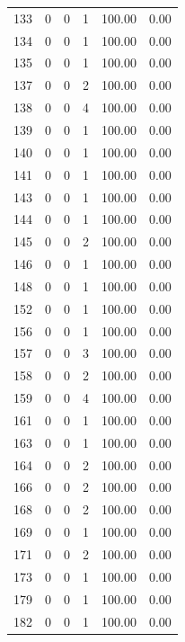 \documentclass[11pt]{article}
\begin{document}
\begin{longtable}{r|r|r|r|r|r}
    133   & 0     & 0     & 1     & 100.00 & 0.00 \\
    134   & 0     & 0     & 1     & 100.00 & 0.00 \\
    135   & 0     & 0     & 1     & 100.00 & 0.00 \\
    137   & 0     & 0     & 2     & 100.00 & 0.00 \\
    138   & 0     & 0     & 4     & 100.00 & 0.00 \\
    139   & 0     & 0     & 1     & 100.00 & 0.00 \\
    140   & 0     & 0     & 1     & 100.00 & 0.00 \\
    141   & 0     & 0     & 1     & 100.00 & 0.00 \\
    143   & 0     & 0     & 1     & 100.00 & 0.00 \\
    144   & 0     & 0     & 1     & 100.00 & 0.00 \\
    145   & 0     & 0     & 2     & 100.00 & 0.00 \\
    146   & 0     & 0     & 1     & 100.00 & 0.00 \\
    148   & 0     & 0     & 1     & 100.00 & 0.00 \\
    152   & 0     & 0     & 1     & 100.00 & 0.00 \\
    156   & 0     & 0     & 1     & 100.00 & 0.00 \\
    157   & 0     & 0     & 3     & 100.00 & 0.00 \\
    158   & 0     & 0     & 2     & 100.00 & 0.00 \\
    159   & 0     & 0     & 4     & 100.00 & 0.00 \\
    161   & 0     & 0     & 1     & 100.00 & 0.00 \\
    163   & 0     & 0     & 1     & 100.00 & 0.00 \\
    164   & 0     & 0     & 2     & 100.00 & 0.00 \\
    166   & 0     & 0     & 2     & 100.00 & 0.00 \\
    168   & 0     & 0     & 2     & 100.00 & 0.00 \\
    169   & 0     & 0     & 1     & 100.00 & 0.00 \\
    171   & 0     & 0     & 2     & 100.00 & 0.00 \\
    173   & 0     & 0     & 1     & 100.00 & 0.00 \\
    179   & 0     & 0     & 1     & 100.00 & 0.00 \\
    182   & 0     & 0     & 1     & 100.00 & 0.00 \\

\end{longtable}
\end{document}
